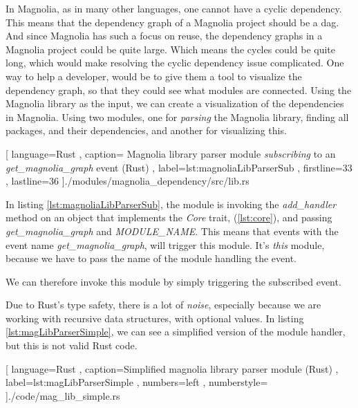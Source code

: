 In Magnolia, as in many other languages, one cannot have a cyclic dependency.
This means that the dependency graph of a Magnolia project should be a
\gls*{dag}. And since Magnolia has such a focus on reuse, the dependency graphs
in a Magnolia project could be quite large. Which means the cycles could be
quite long, which would make resolving the cyclic dependency issue complicated.
One way to help a developer, would be to give them a tool to visualize the
dependency graph, so that they could see what modules are connected. Using the
Magnolia library as the input, we can create a visualization of the dependencies
in Magnolia. Using two modules, one for \textit{parsing} the Magnolia library,
finding all packages, and their dependencies, and another for visualizing
this.

\begin{code}[H]
  
    [ language=Rust
    , caption={
      Magnolia library parser module \textit{subscribing} to an
      \textit{get\_magnolia\_graph } event (Rust)
    }
    , label=lst:magnoliaLibParserSub
    , firstline=33
    , lastline=36
    ]{./modules/magnolia\_dependency/src/lib.rs}
\end{code}

In listing \ref{lst:magnoliaLibParserSub}, the module is invoking the
\textit{add\_handler} method on an object that implements the \textit{Core} trait,
(\ref{lst:core}), and passing \textit{get\_magnolia\_graph} and
\textit{MODULE\_NAME}. This means that events with the event name
\textit{get\_magnolia\_graph}, will trigger this module. It's \textit{this}
module, because we have to pass the name of the module handling the event.

We can therefore invoke this module by simply triggering the subscribed event.

Due to Rust's type safety, there is a lot of \textit{noise}, especially because
we are working with recursive data structures, with optional values. In listing
\ref{lst:magLibParserSimple}, we can see a simplified version of the module
handler, but this is not valid Rust code.

\begin{code}[H]
  
    [ language=Rust
    , caption={Simplified magnolia library parser module (Rust)}
    , label=lst:magLibParserSimple
    , numbers=left
    , numberstyle=\tiny\color{gray}
    ]{./code/mag\_lib\_simple.rs}
\end{code}

